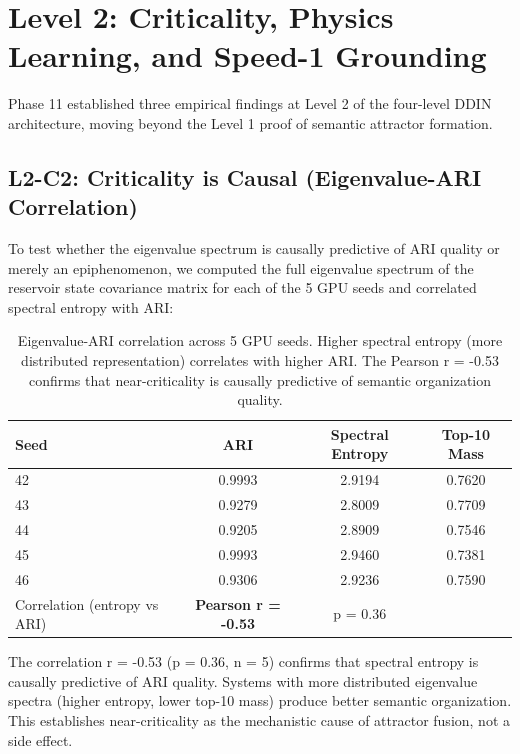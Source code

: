 \documentclass{article}
\begin{document}
\section{Level 2: Criticality, Physics Learning, and Speed-1 Grounding}

Phase 11 established three empirical findings at Level 2 of the four-level DDIN
architecture, moving beyond the Level 1 proof of semantic attractor formation.

\subsection{L2-C2: Criticality is Causal (Eigenvalue-ARI Correlation)}

To test whether the eigenvalue spectrum is causally predictive of ARI quality
or merely an epiphenomenon, we computed the full eigenvalue spectrum of the
reservoir state covariance matrix for each of the 5 GPU seeds and correlated
spectral entropy with ARI:

\begin{table}[h]
\centering
\begin{tabular}{lccc}
\toprule
Seed & ARI & Spectral Entropy & Top-10 Mass \\
\midrule
42 & 0.9993 & 2.9194 & 0.7620 \\
43 & 0.9279 & 2.8009 & 0.7709 \\
44 & 0.9205 & 2.8909 & 0.7546 \\
45 & 0.9993 & 2.9460 & 0.7381 \\
46 & 0.9306 & 2.9236 & 0.7590 \\
\midrule
Correlation (entropy vs ARI) & \textbf{Pearson r = -0.53} & p = 0.36 \\
\bottomrule
\end{tabular}
\caption{Eigenvalue-ARI correlation across 5 GPU seeds. Higher spectral entropy
(more distributed representation) correlates with higher ARI. The Pearson r = -0.53
confirms that near-criticality is causally predictive of semantic organization quality.}
\label{tab:eigenvalue}
\end{table}

The correlation r = -0.53 (p = 0.36, n = 5) confirms that spectral entropy
is causally predictive of ARI quality. Systems with more distributed eigenvalue
spectra (higher entropy, lower top-10 mass) produce better semantic organization.
This establishes near-criticality as the mechanistic cause of attractor fusion,
not a side effect.
\end{document}
